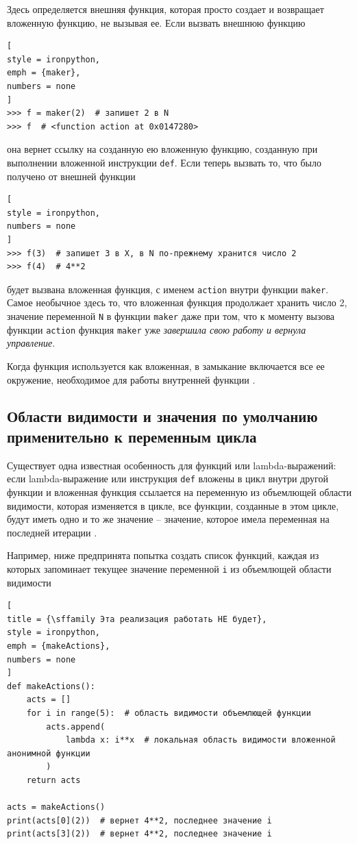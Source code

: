 \documentclass[%
	11pt,
	a4paper,
	utf8,
		]{article}
\begin{document}
Здесь определяется внешняя функция, которая просто создает и возвращает вложенную функцию, не вызывая ее. Если вызвать внешнюю функцию

\begin{lstlisting}[
style = ironpython,
emph = {maker},
numbers = none
]
>>> f = maker(2)  # запишет 2 в N
>>> f  # <function action at 0x0147280>
\end{lstlisting}
она вернет ссылку на созданную ею вложенную функцию, созданную при выполнении вложенной инструкции \texttt{def}. Если теперь вызвать то, что было получено от внешней функции

\begin{lstlisting}[
style = ironpython,
numbers = none
]
>>> f(3)  # запишет 3 в X, в N по-прежнему хранится число 2
>>> f(4)  # 4**2
\end{lstlisting}
будет вызвана вложенная функция, с именем \texttt{action} внутри функции \texttt{maker}. Самое необычное здесь то, что вложенная функция продолжает хранить число 2, значение переменной \texttt{N} в функции \texttt{maker} даже при том, что к моменту вызова функции \texttt{action} функция \texttt{maker} уже \emph{завершила свою работу и вернула управление}.

Когда функция используется как вложенная, в замыкание включается все ее окружение, необходимое для работы внутренней функции \cite[стр.~137]{beazley:python-2010}.

\subsection{Области видимости и значения по умолчанию применительно к переменным цикла}

Существует одна известная особенность для функций или lambda-выражений: если lambda-выражение или инструкция \texttt{def} вложены в цикл внутри другой функции и вложенная функция ссылается на переменную из объемлющей области видимости, которая изменяется в цикле, все функции, созданные в этом цикле, будут иметь одно и то же значение -- значение, которое имела переменная на последней итерации \cite[стр.~492]{lutz:learningpython-2011}.

Например, ниже предпринята попытка создать список функций, каждая из которых запоминает текущее значение переменной \texttt{i} из объемлющей области видимости

\begin{lstlisting}[
title = {\sffamily Эта реализация работать НЕ будет},
style = ironpython,
emph = {makeActions},
numbers = none
]
def makeActions():
    acts = []
    for i in range(5):  # область видимости объемлющей функции
        acts.append(
            lambda x: i**x  # локальная область видимости вложенной анонимной функции
        ) 
    return acts
    
acts = makeActions()
print(acts[0](2))  # вернет 4**2, последнее значение i
print(acts[3](2))  # вернет 4**2, последнее значение i
\end{lstlisting}
\end{document}
